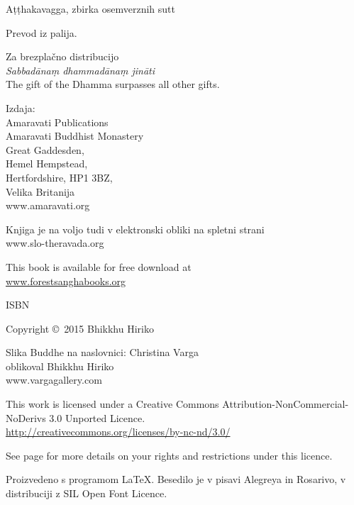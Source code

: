 \cleartoverso

\thispagestyle{empty}

{\smaller\setlength{\parskip}{0.5em}\setlength{\parindent}{0em}%
{\raggedright

Aṭṭhakavagga, zbirka osemverznih sutt

Prevod iz palija.

Za brezplačno distribucijo\\
\emph{Sabbadānaṃ dhammadānaṃ jināti}\\
The gift of the Dhamma surpasses all other gifts.

Izdaja:\\
Amaravati Publications\\
Amaravati Buddhist Monastery\\
Great Gaddesden,\\
Hemel Hempstead,\\
Hertfordshire, HP1 3BZ,\\
Velika Britanija\\
www.amaravati.org

Knjiga je na voljo tudi v elektronski obliki na spletni strani\\
www.slo-theravada.org

This book is available for free download at\\
\href{http://forestsanghabooks.org/}{www.forestsanghabooks.org}

ISBN \theISBN

Copyright \copyright\ 2015 Bhikkhu Hiriko

Slika Buddhe na naslovnici: Christina Varga\\
oblikoval Bhikkhu Hiriko\\
www.vargagallery.com

\vfill

This work is licensed under a Creative Commons Attribution-NonCommercial-NoDerivs 3.0 Unported Licence.\\
\href{http://creativecommons.org/licenses/by-nc-nd/3.0/}{http://creativecommons.org/licenses/by-nc-nd/3.0/}

See page \pageref{copyright-details} for more details on your rights and restrictions under this licence.

Proizvedeno s programom {\selectfont\LaTeX}. Besedilo je v pisavi Alegreya in Rosarivo, v distribuciji z SIL Open Font Licence.

\theEditionInfo

\thePrintedByInfo

}}


